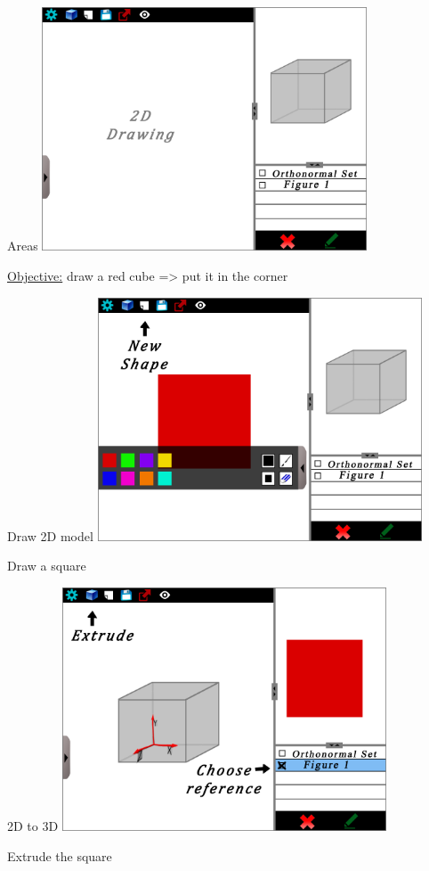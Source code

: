 \documentclass[a4paper,10pt]{beamer}
\begin{document}
			\begin{frame}{Areas}
				\includegraphics[height=205pt]{maquette/maquette_2.png}
				
				\pause
				
				\underline{Objective:} draw a red cube => put it in the corner
			\end{frame}
			
			\begin{frame}{Draw 2D model}
				\includegraphics[height=205pt]{maquette/maquette_3.png}
				
				Draw a square
			\end{frame}
			
			\begin{frame}{2D to 3D}
				\includegraphics[height=205pt]{maquette/maquette_4.png}
				
				Extrude the square
			\end{frame}
			
\end{document}
